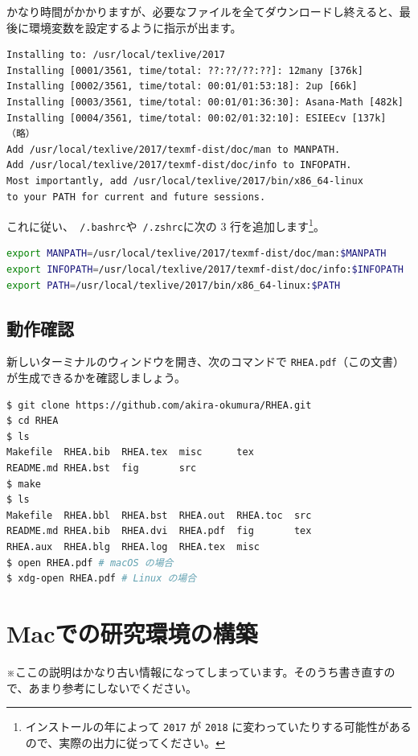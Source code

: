 かなり時間がかかりますが、必要なファイルを全てダウンロードし終えると、最後に環境変数を設定するように指示が出ます。

\begin{lstlisting}
Installing to: /usr/local/texlive/2017
Installing [0001/3561, time/total: ??:??/??:??]: 12many [376k]
Installing [0002/3561, time/total: 00:01/01:53:18]: 2up [66k]
Installing [0003/3561, time/total: 00:01/01:36:30]: Asana-Math [482k]
Installing [0004/3561, time/total: 00:02/01:32:10]: ESIEEcv [137k]
（略）
Add /usr/local/texlive/2017/texmf-dist/doc/man to MANPATH.
Add /usr/local/texlive/2017/texmf-dist/doc/info to INFOPATH.
Most importantly, add /usr/local/texlive/2017/bin/x86_64-linux
to your PATH for current and future sessions.
\end{lstlisting}

これに従い、\texttt{~/.bashrc}や\texttt{~/.zshrc}に次の 3 行を追加します\footnote{インストールの年によって \texttt{2017} が \texttt{2018} に変わっていたりする可能性があるので、実際の出力に従ってください。}。

\begin{lstlisting}[language=bash]
export MANPATH=/usr/local/texlive/2017/texmf-dist/doc/man:$MANPATH
export INFOPATH=/usr/local/texlive/2017/texmf-dist/doc/info:$INFOPATH
export PATH=/usr/local/texlive/2017/bin/x86_64-linux:$PATH
\end{lstlisting}

\section{動作確認}

新しいターミナルのウィンドウを開き、次のコマンドで \texttt{RHEA.pdf}（この文書）が生成できるかを確認しましょう。

\begin{lstlisting}[language=bash]
$ git clone https://github.com/akira-okumura/RHEA.git
$ cd RHEA
$ ls
Makefile  RHEA.bib  RHEA.tex  misc      tex
README.md RHEA.bst  fig       src
$ make
$ ls
Makefile  RHEA.bbl  RHEA.bst  RHEA.out  RHEA.toc  src
README.md RHEA.bib  RHEA.dvi  RHEA.pdf  fig       tex
RHEA.aux  RHEA.blg  RHEA.log  RHEA.tex  misc
$ open RHEA.pdf # macOS の場合
$ xdg-open RHEA.pdf # Linux の場合
\end{lstlisting}

\chapter{Macでの研究環境の構築}
※ここの説明はかなり古い情報になってしまっています。そのうち書き直すので、あまり参考にしないでください。

